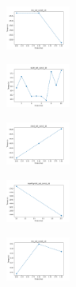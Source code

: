 \vspace*{\fill}

\newpage

\vspace*{\fill}

\begin{figure}[H]    
    \centering
    \begin{subfigure}
        \centering
        \includegraphics[width=0.234\textwidth]{img/copkm/iris_set_const_10_949004259_time.png}
    \end{subfigure}
    \hfill
    \begin{subfigure}
        \centering
        \includegraphics[width=0.234\textwidth]{img/copkm/ecoli_set_const_10_949004259_time.png}
    \end{subfigure}
    \hfill
    \begin{subfigure}
        \centering
        \includegraphics[width=0.234\textwidth]{img/copkm/rand_set_const_10_949004259_time.png}
    \end{subfigure}
    \hfill
    \begin{subfigure}
        \centering
        \includegraphics[width=0.234\textwidth]{img/copkm/newthyroid_set_const_10_949004259_time.png}
    \end{subfigure}
    \hfill
    \begin{subfigure}
        \centering
        \includegraphics[width=0.234\textwidth]{img/copkm/iris_set_const_10_589741062_time.png}

\end{subfigure}
\end{figure}
